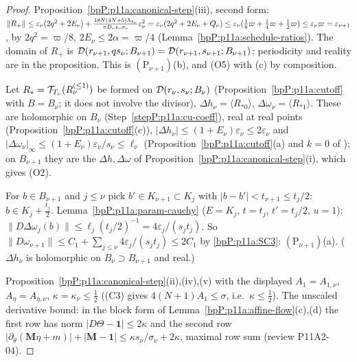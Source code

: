 \begin{proof}
\label{stepP:p11a:il-rem} Proposition~\ref{bpP:p11a:canonical-step}(iii), second form: $\lVert R_+\rVert_{}\le\varepsilon_\nu(2q^2+2E_\nu)+\frac{18N(4N+5)\Lambda_{\delta_\nu}}{\pi D_\nu s_\nu\sigma_\nu}\varepsilon_\nu^2=\varepsilon_\nu(2q^2+2E_\nu+Q_\nu)\le\varepsilon_\nu(\frac18\varpi+\frac14\varpi+\frac12\varpi)\le\varepsilon_\nu\varpi=\varepsilon_{\nu+1}$, by $2q^2=\varpi/8$, $2E_\nu\le2\alpha=\varpi/4$ (Lemma~\ref{bpP:p11a:schedule-ratios}). The domain of $R_+$ is $\mathcal D(r_{\nu+1},qs_\nu;B_{\nu+1})=\mathcal D(r_{\nu+1},s_{\nu+1};B_{\nu+1})$; periodicity and reality are in the proposition. This is $(\mathrm P_{\nu+1})$(b), and (O5) with (c) by composition.

\label{stepP:p11a:il-inc} Let $R_*=\mathcal T_{T_\nu}(R_\nu^{(\le1)})$ be formed on $\mathcal D(r_\nu,s_\nu;B_\nu)$ (Proposition~\ref{bpP:p11a:cutoff} with $B=B_\nu$; it does not involve the divisor), $\Delta h_\nu=\langle R_{*0}\rangle$, $\Delta\omega_\nu=\langle R_{*1}\rangle$. These are holomorphic on $B_\nu$ (Step~\ref{stepP:p11a:cu-coeff}), real at real points (Proposition~\ref{bpP:p11a:cutoff}(c)), $\lvert\Delta h_\nu\rvert\le(1+E_\nu)\varepsilon_\nu\le2\varepsilon_\nu$ and $\lvert\Delta\omega_\nu\rvert_\infty\le(1+E_\nu)\varepsilon_\nu/s_\nu\le\ell_\nu$ (Proposition~\ref{bpP:p11a:cutoff}(a) and $k=0$ of ); on $B_{\nu+1}$ they are the $\Delta h,\Delta\omega$ of Proposition~\ref{bpP:p11a:canonical-step}(i), which gives (O2).

\label{stepP:p11a:il-dom} For $b\in B_{\nu+1}$ and $j\le\nu$ pick $b'\in K_{\nu+1}\subset K_j$ with $\lvert b-b'\rvert<t_{\nu+1}\le t_j/2$: $b\in K_j+\frac{t_j}2$. Lemma~\ref{bpP:p11a:param-cauchy} ($E=K_j$, $t=t_j$, $t'=t_j/2$, $u=1$): $\lVert D\Delta\omega_j(b)\rVert\le\ell_j(t_j/2)^{-1}=4\varepsilon_j/(s_jt_j)$. So $\lVert D\omega_{\nu+1}\rVert\le C_1+\sum_{j\le\nu}4\varepsilon_j/(s_jt_j)\le2C_1$ by \ref{bpP:p11a:SC3}: $(\mathrm P_{\nu+1})$(a). ($\Delta h_\nu$ is holomorphic on $B_\nu\supset B_{\nu+1}$ and real.)

\label{stepP:p11a:il-map} Proposition~\ref{bpP:p11a:canonical-step}(ii),(iv),(v) with the displayed $A_1=A_{1,\nu}$, $A_\eta=A_{\eta,\nu}$, $\kappa=\kappa_\nu\le\frac12$ ((C3) gives $4(N+1)A_1\le\sigma$, i.e.\ $\kappa\le\frac12$). The unscaled derivative bound: in the block form of Lemma~\ref{bpP:p11a:affine-flow}(c),(d) the first row has norm $\lvert D\Theta-\mathbf 1\rvert\le2\kappa$ and the second row $\lvert\partial_\theta(\mathbf M\eta+m)\rvert+\lvert\mathbf M-\mathbf 1\rvert\le\kappa s_\nu/\sigma_\nu+2\kappa$, maximal row sum (review P11A2-04). \end{proof}

